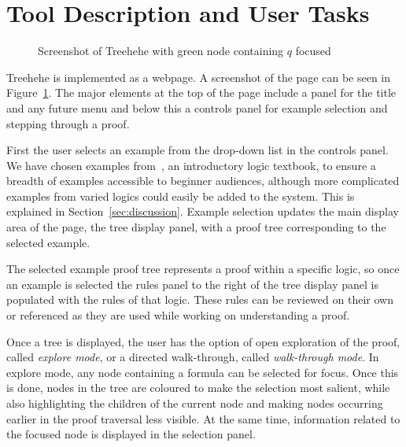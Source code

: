 \documentclass[journal]{vgtc}                %
\newcommand{\projectname}{Treehehe}
\begin{document}
\section{Tool Description and User Tasks}
\label{sec:tooldesc}

\begin{figure}

\begin{center}
\end{center}

\caption{Screenshot of \projectname{} with green node containing $q$ focused}
\label{fig:screenshot}

\end{figure}

\projectname{} is implemented as a webpage. A screenshot of the page can be seen in Figure~\ref{fig:screenshot}. The major elements at the top of the page include a panel for the title and any future menu and below this a controls panel for example selection and stepping through a proof.

First the user selects an example from the drop-down list in the controls panel. We have chosen examples from~\cite{logicincs-huth+ryan}, an introductory logic textbook, to ensure a breadth of examples accessible to beginner audiences, although more complicated examples from varied logics could easily be added to the system. This is explained in Section~\ref{sec:discussion}. Example selection updates the main display area of the page, the tree display panel, with a proof tree corresponding to the selected example.

The selected example proof tree represents a proof within a specific logic, so once an example is selected the rules panel to the right of the tree display panel is populated with the rules of that logic. These rules can be reviewed on their own or referenced as they are used while working on understanding a proof.

Once a tree is displayed, the user has the option of open exploration of the proof, called \textit{explore mode}, or a directed walk-through, called \textit{walk-through mode}. In explore mode, any node containing a formula can be selected for focus. Once this is done, nodes in the tree are coloured to make the selection most salient, while also highlighting the children of the current node and making nodes occurring earlier in the proof traversal less visible. At the same time, information related to the focused node is displayed in the selection panel.
\end{document}
